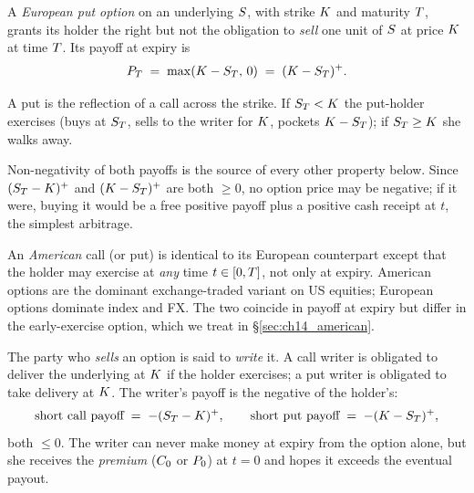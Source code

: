 \begin{definition}
\label{def:european_put}
A \emph{European put option} on an underlying $S$, with strike
$K$ and maturity $T$, grants its holder the right but
not the obligation to \emph{sell} one unit of $S$ at price
$K$ at time $T$. Its payoff at expiry is
\begin{equation}
  P_T \;=\; \max(K - S_T,\, 0)
       \;=\; (K - S_T)^+.
  \label{eq:put_payoff}
\end{equation}
\end{definition}

A put is the reflection of a call across the strike. If
$S_T < K$ the put-holder exercises (buys at $S_T$,
sells to the writer for $K$, pockets $K - S_T$);
if $S_T \geq K$ she walks away.

Non-negativity of both payoffs is the source of every other
property below. Since $(S_T - K)^+$ and
$(K - S_T)^+$ are both $\geq 0$, no option price may be
negative; if it were, buying it would be a free positive payoff
plus a positive cash receipt at $t$, the simplest arbitrage.

\begin{definition}
\label{def:american_option}
An \emph{American} call (or put) is identical to its European
counterpart except that the holder may exercise at \emph{any}
time $t \in [0, T]$, not only at expiry. American options
are the dominant exchange-traded variant on US equities; European
options dominate index and FX. The two coincide in payoff at
expiry but differ in the early-exercise option, which we treat
in \S\ref{sec:ch14_american}.
\end{definition}

The party who \emph{sells} an option is said to \emph{write} it.
A call writer is obligated to deliver the underlying at
$K$ if the holder exercises; a put writer is obligated to
take delivery at $K$. The writer's payoff is the negative
of the holder's:
\begin{equation*}
  \text{short call payoff} \;=\; -(S_T - K)^+,
  \qquad
  \text{short put payoff}  \;=\; -(K - S_T)^+,
\end{equation*}
both $\leq 0$. The writer can never make money at expiry from
the option alone, but she receives the \emph{premium} ($C_0$
or $P_0$) at $t = 0$ and hopes it exceeds the eventual payout.

